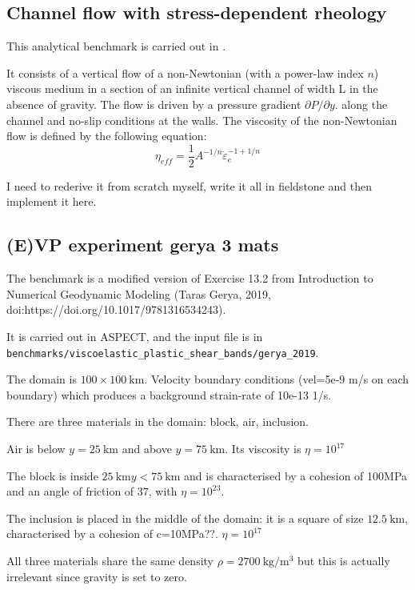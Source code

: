 \documentclass[a4paper]{article}
\begin{document}
\subsection{Channel flow with stress-dependent rheology}

This analytical benchmark is carried out in 
\textcite{geyu03,frbt19,gery10,elga10}.

It consists of a vertical flow of a non-Newtonian (with a power-law index $n$) 
viscous medium in a section of an infinite vertical channel of width L in the
absence of gravity. 
The flow is driven by a pressure gradient $\partial P/\partial y$.
along the channel and no-slip conditions at the walls.
The viscosity of the non-Newtonian flow is defined by the following 
equation:
\[
\eta_{eff} = \frac12 A^{-1/n} \dot\varepsilon_e^{-1+1/n}
\] 


{\color{red} I need to rederive it from scratch myself, 
write it all in fieldstone and then implement it here.}

\subsection{(E)VP experiment gerya 3 mats}

The benchmark is a modified version of Exercise 13.2 from
Introduction to Numerical Geodynamic Modeling (Taras Gerya,
2019, doi:https://doi.org/10.1017/9781316534243).

It is carried out in ASPECT, and the input file is in {\tt benchmarks/viscoelastic\_plastic\_shear\_bands/gerya\_2019}.

The domain is $100\times 100~\si{\kilo\meter}$.
Velocity boundary conditions (vel=5e-9 m/s on each boundary)
which produces a background strain-rate of 10e-13 1/s.

There are three materials in the domain: block, air, inclusion.

Air is below $y=25~\si{\kilo\meter}$ and above  $y=75~\si{\kilo\meter}$. 
Its viscosity is $\eta=10^{17}$


The block is inside $25~\si{\kilo\meter}y<75~\si{\kilo\meter}$ and is characterised
by a cohesion of 100MPa and an angle of friction of 37, with $\eta=10^{23}$. 

The inclusion is placed in the middle of the domain: it is a square of size $12.5~\si{\kilo\meter}$, 
characterised by a cohesion of c=10MPa??. $\eta=10^{17}$


All three materials share the same density $\rho=2700~\si{\kg\per\cubic\meter}$
but this is actually irrelevant since gravity is set to zero.
\end{document}
